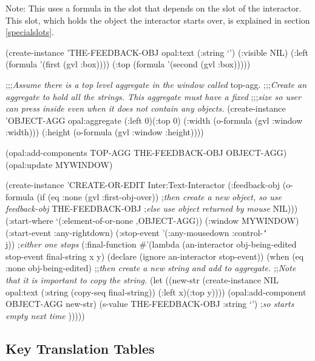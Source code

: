 Note: This uses a formula in the  slot that depends on
the  slot of the interactor.  This slot, which holds the
object the interactor starts over, is explained in section \ref{specialslots}.
\begin{programexample}
(create-instance 'THE-FEEDBACK-OBJ opal:text
   (:string `')
   (:visible NIL)
   (:left (formula '(first (gvl :box))))
   (:top (formula '(second (gvl :box)))))

;;;{\it Assume there is a top level aggregate in the window called} top-agg.
;;;{\it Create an aggregate to hold all the strings.  This aggregate must have a fixed}
;;;{\it    size so user can press inside even when it does not contain any objects.}
(create-instance 'OBJECT-AGG opal:aggregate
   (:left 0)(:top 0)
   (:width (o-formula (gvl :window :width)))
   (:height (o-formula (gvl :window :height))))

(opal:add-components TOP-AGG THE-FEEDBACK-OBJ OBJECT-AGG)
(opal:update MYWINDOW)

(create-instance 'CREATE-OR-EDIT Inter:Text-Interactor
    (:feedback-obj (o-formula
		    (if (eq :none (gvl :first-obj-over))
			;{\it then create a new object, so use feedback-obj}
			THE-FEEDBACK-OBJ
			;{\it else use object returned by mouse}
			NIL)))
    (:start-where `(:element-of-or-none ,OBJECT-AGG))
    (:window MYWINDOW)
    (:start-event :any-rightdown)
    (:stop-event '(:any-mousedown :control-{\tt\char`\\}j)) ;{\it either one stops}
    (:final-function
     \#'(lambda (an-interactor obj-being-edited stop-event final-string x y)
	 (declare (ignore an-interactor stop-event))
	 (when (eq :none obj-being-edited)
	   ;;{\it then create a new string and add to aggregate.}
	   ;;{\it Note that it is important to copy the string.}
	   (let ((new-str (create-instance NIL opal:text
			     (:string (copy-seq final-string))
			     (:left x)(:top y))))
	     (opal:add-component OBJECT-AGG new-str)
	     (s-value THE-FEEDBACK-OBJ :string `') ;{\it so starts empty next time}
	     )))))
\end{programexample}

\subsection{Key Translation Tables}
\label{keytranslations}

